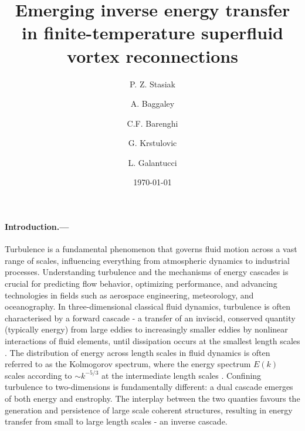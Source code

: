 \documentclass[%
 reprint,
 amsmath,amssymb,
 aps,
 prl,
]{revtex4-2}
\begin{document}

\title{Emerging inverse energy transfer in finite-temperature superfluid vortex reconnections}

\author{P. Z. Stasiak}
\author{A. Baggaley}
\author{C.F. Barenghi}

\author{G. Krstulovic}

\author{L. Galantucci}

\date{\today}%

\begin{abstract}
\blindtext
\end{abstract}

\maketitle

\paragraph*{Introduction.---}

Turbulence is a fundamental phenomenon that governs fluid motion across a vast range of scales, influencing everything from atmospheric dynamics to industrial processes. Understanding turbulence and the mechanisms of energy cascades is crucial for predicting flow behavior, optimizing performance, and advancing technologies in fields such as aerospace engineering, meteorology, and oceanography. In three-dimensional classical fluid dynamics, turbulence is often characterised by a forward cascade - a transfer of an inviscid, conserved quantity (typically energy) from large eddies to increasingly smaller eddies by nonlinear interactions of fluid elements, until dissipation occurs at the smallest length scales \cite{richardson1922weather}. The distribution of energy across length scales in fluid dynamics is often referred to as the Kolmogorov spectrum, where the energy spectrum $E(k)$ scales according to $\sim k^{-5/3}$ at the intermediate length scales \cite{frisch1995}.  
Confining turbulence to two-dimensions is fundamentally different: a dual cascade emerges of both energy and enstrophy. The interplay between the two quanties favours the generation and persistence of large scale coherent structures, resulting in energy transfer from small to large length scales - an inverse cascade. 
\end{document}
